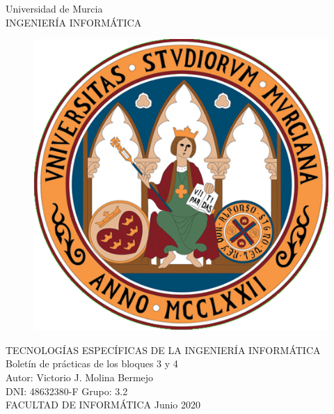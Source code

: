 \documentclass[12 pt]{article}
\begin{document}
\setcounter{page}{1}			   %

\thispagestyle{empty}			   %
\begin{center}
	\noindent Universidad de Murcia\\
	\noindent INGENIERÍA INFORMÁTICA\\[0.8in]
\end{center}
\begin{figure}[h]
	\centering
	\includegraphics[height=6 cm]{images/uni.png} %
	\vspace{0cm}
\end{figure}
\vspace{1cm}
\begin{center}
	TECNOLOGÍAS ESPECÍFICAS DE LA INGENIERÍA INFORMÁTICA\\
	Boletín de prácticas de los bloques 3 y 4\\[1cm]
	\vfill
	{\selectfont
     Autor: Victorio J. Molina Bermejo\\
	 DNI: 48632380-F \hspace{8pt} Grupo: 3.2\\
	 }
	\vfill
	\noindent FACULTAD DE INFORMÁTICA \hfill Junio 2020\\
\end{center}
\newpage
\tableofcontents
\newpage
\end{document}
